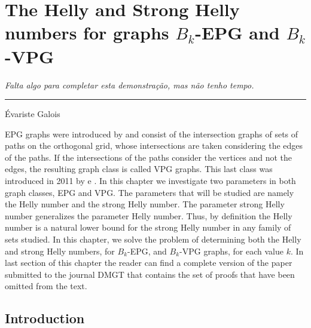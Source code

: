 \chapter{The Helly and Strong Helly numbers for graphs $B_k$-EPG and $B_k$-VPG}
\label{cap:iv}

\begin{flushright}
\begin{minipage}[t][0cm][b]{0.47\textwidth}
\emph{
Falta algo para completar esta demonstração, mas não tenho tempo.}
\end{minipage}

\rule[0cm]{7cm}{0.03cm}%

Évariste Galois
\end{flushright}


EPG graphs were introduced by \citet{golumbic2009} and consist of the intersection graphs of sets of paths on the orthogonal grid, whose intersections are taken considering the edges of the paths. If the intersections of the paths consider the vertices and not the edges, the resulting graph class is called VPG graphs. This last class was introduced in 2011 by \citet{asinowski2011string} e \citet{asinowski2012}.  In this chapter we investigate two parameters in both graph classes, EPG and VPG. The parameters that will be studied are namely the Helly number and the strong Helly number. The parameter strong Helly number  generalizes the parameter Helly number. Thus, by definition the Helly number is a natural lower bound for the strong Helly number in any family of sets studied. In this chapter, we solve the problem of determining both the Helly and strong Helly numbers, for $B_k$-EPG, and $B_k$-VPG graphs, for each value $k$. In last section of this chapter the reader can find a complete version of the paper submitted to  the journal DMGT that contains the set of proofs that have been omitted from the text.






\section{Introduction}


